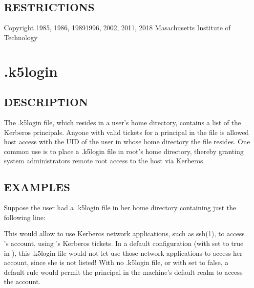 \documentclass[letterpaper,10pt,english]{sphinxmanual}
\begin{document}
\subsection{RESTRICTIONS}
\label{\detokenize{user/user_config/kerberos:restrictions}}
\sphinxAtStartPar
Copyright 1985, 1986, 1989\sphinxhyphen{}1996, 2002, 2011, 2018 Masachusetts
Institute of Technology


\section{.k5login}
\label{\detokenize{user/user_config/k5login:k5login}}\label{\detokenize{user/user_config/k5login:k5login-5}}\label{\detokenize{user/user_config/k5login::doc}}

\subsection{DESCRIPTION}
\label{\detokenize{user/user_config/k5login:description}}
\sphinxAtStartPar
The .k5login file, which resides in a user’s home directory, contains
a list of the Kerberos principals.  Anyone with valid tickets for a
principal in the file is allowed host access with the UID of the user
in whose home directory the file resides.  One common use is to place
a .k5login file in root’s home directory, thereby granting system
administrators remote root access to the host via Kerberos.


\subsection{EXAMPLES}
\label{\detokenize{user/user_config/k5login:examples}}
\sphinxAtStartPar
Suppose the user  had a .k5login file in her home directory
containing just the following line:

\begin{sphinxVerbatim}[commandchars=\\\{\}]
\end{sphinxVerbatim}

\sphinxAtStartPar
This would allow  to use Kerberos network applications, such as
ssh(1), to access ’s account, using ’s Kerberos
tickets.  In a default configuration (with  set
to true in ), this .k5login file would not let
 use those network applications to access her account, since
she is not listed!  With no .k5login file, or with 
set to false, a default rule would permit the principal  in the
machine’s default realm to access the  account.
\end{document}
